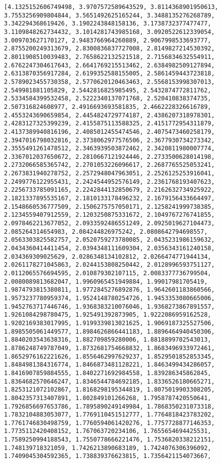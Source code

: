 \documentclass[11pt]{article}
\begin{document}
\begin{Verbatim}[commandchars=\\\{\}]
[4.1325152606749498, 3.9707572589643529, 3.8114368901950613, 3.7553256909804844, 3.5651492625165244, 3.3488135276268789, 3.342294368619426, 3.1902243848158136, 3.1738732377477477, 3.1109848262734432, 3.1014281743985168, 3.0920522612339054, 3.009703627170127, 2.9483766964260889, 2.9067998533693777, 2.8755200249313679, 2.8300836837727008, 2.8149827214530392, 2.8011908510039483, 2.7658622132521518, 2.7156834632554911, 2.6762247304617643, 2.6641769215513462, 2.6384982509127894, 2.6313870356917284, 2.6199352588155005, 2.5861459443723818, 2.5789023455730358, 2.5770620120463463, 2.5568153998307013, 2.549981881105829, 2.5442816825985495, 2.5432874772811762, 2.5334584399532458, 2.5222340137071768, 2.520410838374735, 2.507316824608977, 2.4916693693581835, 2.4662228326616789, 2.4553243690659854, 2.4454824729774187, 2.4386207318978301, 2.4283127325399239, 2.4155875113588325, 2.4151772954311879, 2.4137389940816196, 2.4085012455474546, 2.4075473460258179, 2.3947016798032816, 2.3738062977576506, 2.3677930734273342, 2.3555491261478512, 2.3463939503872462, 2.3420811980007774, 2.3367012037650672, 2.2810667121924446, 2.2733500628014198, 2.2732066585365742, 2.2701053226096617, 2.2687765525053241, 2.2673831940278752, 2.2572948047963051, 2.2526125253916041, 2.2499776122955431, 2.2424544952576149, 2.2361768193407623, 2.2256733785091165, 2.2242844132850679, 2.2162632734925922, 2.1821337895535167, 2.1810133178496232, 2.1679156433664497, 2.1548660536777509, 2.1506275757050171, 2.1258241999738385, 2.1234559407912559, 2.1203250875331672, 2.1049767276741855, 2.0978462213677052, 2.0933592486551249, 2.0925019627104473, 2.085264314654983, 2.084244826975242, 2.0808642794698557, 2.0563303825582757, 2.0520759273780085, 2.0435231986159632, 2.0434360414411454, 2.0394348111609304, 2.0356343161240158, 2.034369309025629, 2.0286348134102812, 2.0266474771944134, 2.0261178271045863, 2.0244153808250442, 2.0128996593751127, 2.0112065576694595, 2.010879302107115, 2.0083377736799504, 2.0080089813682047, 1.9960965451949884, 1.99017981705419, 1.9874793815380811, 1.9772845276892876, 1.9642601183860566, 1.9573237780959374, 1.9524148780254726, 1.9453353080665006, 1.9452763717446746, 1.9368383210076046, 1.9368273867891557, 1.9261084298780475, 1.925491392873905, 1.9222086959162528, 1.9202169383017995, 1.9199339813021625, 1.9069187325527506, 1.8985505061449577, 1.8984626866441183, 1.8896464940450306, 1.8840203543638316, 1.882709859280006, 1.8818899702543013, 1.8786248749787049, 1.8732681754668832, 1.8683496933972461, 1.8652976162221626, 1.8556462997629237, 1.8529501852853345, 1.8484981384316774, 1.8466873481128221, 1.8463499434286057, 1.8416907859884555, 1.8402271692984558, 1.839286345862845, 1.8364682570646247, 1.8346544784692185, 1.8336526180665271, 1.8253121072102867, 1.8168298195344819, 1.8075019903308205, 1.8042357313407891, 1.802849101266268, 1.7958787420550641, 1.7926856697653786, 1.7895890249149984, 1.7868350231073318, 1.7832104883053077, 1.7769110451512777, 1.7764818423783202, 1.7761746830498759, 1.7760594061420276, 1.7757728877146353, 1.7735112420408152, 1.767063720234106, 1.7655654694425531, 1.7589250994188543, 1.7550778666221476, 1.7536820338212151, 1.748139718321059, 1.7426213890683189, 1.7424076306396092, 1.7409045304592365, 1.738839376623815, 1.7356421154073667, 
\end{Verbatim}
\end{document}
